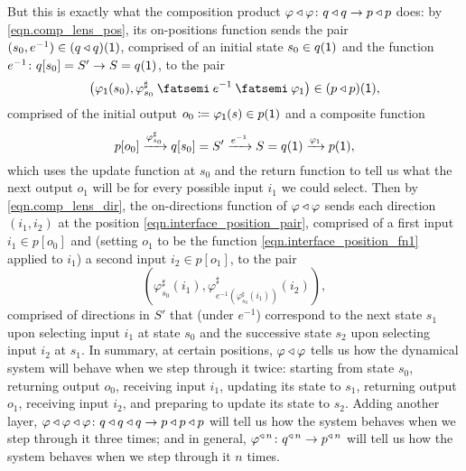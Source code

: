 \documentclass[Book-Poly]{subfiles}
\begin{document}
But this is exactly what the composition product $\varphi\mathbin{\triangleleft}\varphi\colon q\mathbin{\triangleleft} q\to p\mathbin{\triangleleft} p$ does: by \eqref{eqn.comp_lens_pos}, its on-positions function sends the pair $(s_0,e^{-1})\in(q\mathbin{\triangleleft} q)(\textsf{1})$, comprised of an initial state $s_0\in q(\textsf{1})$ and the function $e^{-1}\colon q[s_0]=S'\to S=q(\textsf{1})$, to the pair
\begin{equation} \label{eqn.interface_position_pair}
    \left(\varphi_\1(s_0),\varphi^\sharp_{s_0}\then e^{-1}\then\varphi_\1\right)\in(p\tri p)(\1),
\end{equation}
comprised of the initial output $o_0\coloneqq\varphi_{\textsf{1}}(s)\in p(\textsf{1})$ and a composite function
\begin{equation} \label{eqn.interface_position_fn1}
    p[o_0]\xrightarrow{\varphi^\sharp_{s_0}}q[s_0]=S'\xrightarrow{e^{-1}}S=q(\textsf{1})\xrightarrow{\varphi_{\textsf{1}}}p(\textsf{1}),
\end{equation}
which uses the update function at $s_0$ and the return function to tell us what the next output $o_1$ will be for every possible input $i_1$ we could select.
Then by \eqref{eqn.comp_lens_dir}, the on-directions function of $\varphi\mathbin{\triangleleft}\varphi$ sends each direction $(i_1,i_2)$ at the position \eqref{eqn.interface_position_pair}, comprised of a first input $i_1\in p[o_0]$ and (setting $o_1$ to be the function \eqref{eqn.interface_position_fn1} applied to $i_1$) a second input $i_2\in p[o_1]$, to the pair
\[
    \left(\varphi^\sharp_{s_0}(i_1), \varphi^\sharp_{e^{-1}(\varphi^\sharp_{s_0}(i_1))}(i_2)\right),
\]
comprised of directions in $S'$ that (under $e^{-1}$) correspond to the next state $s_1$ upon selecting input $i_1$ at state $s_0$ and the successive state $s_2$ upon selecting input $i_2$ at $s_1$.
In summary, at certain positions, $\varphi\mathbin{\triangleleft}\varphi$ tells us how the dynamical system will behave when we step through it twice: starting from state $s_0$, returning output $o_0$, receiving input $i_1$, updating its state to $s_1$, returning output $o_1$, receiving input $i_2$, and preparing to update its state to $s_2$.
Adding another layer, $\varphi\mathbin{\triangleleft}\varphi\mathbin{\triangleleft}\varphi\colon q\mathbin{\triangleleft} q\mathbin{\triangleleft} q\to p\mathbin{\triangleleft} p\mathbin{\triangleleft} p$ will tell us how the system behaves when we step through it three times; and in general, $\varphi^{\mathbin{\triangleleft}\,n}\colon q^{\mathbin{\triangleleft}\,n}\to p^{\mathbin{\triangleleft}\,n}$ will tell us how the system behaves when we step through it $n$ times.
\end{document}

